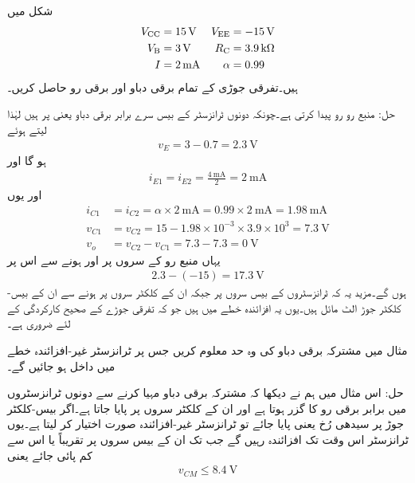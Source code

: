  
شکل  میں 
\begin{align*}
V_{\textup{CC}} &=\SI{+15}{\volt} & V_{\textup{EE}} &=\SI{-15}{\volt} \\
V_{\textup{B}} &=\SI{3}{\volt} &  R_{\textup{C}} &=\SI{3.9}{\kilo \ohm}\\
I &=\SI{2}{\milli \ampere} & \alpha &=\num{0.99}
\end{align*}
ہیں۔تفرقی جوڑی کے تمام برقی دباو اور برقی رو حاصل کریں۔

حل:	منبع رو  رو پیدا کرتی ہے۔چونکہ دونوں ٹرانزسٹر کے بیس  سرے برابر برقی دباو یعنی   پر ہیں لہٰذا   لیتے ہوئے
\begin{align*}
v_E=3-0.7=\SI{2.3}{\volt}
\end{align*}
ہو گا اور
\begin{align*}
i_{E1}=i_{E2}=\frac{\SI{4}{\milli \ampere}}{2}=\SI{2}{\milli \ampere}
\end{align*}
اور یوں
\begin{align*}
i_{C1}&=i_{C2}=\alpha \times \SI{2}{\milli \ampere}=0.99 \times \SI{2}{\milli \ampere}=\SI{1.98}{\milli \ampere}\\
v_{C1}&=v_{C2}=15-1.98\times 10^{-3} \times 3.9 \times 10^3=\SI{7.3}{\volt}\\
v_o&=v_{C2}-v_{C1}=7.3-7.3=\SI{0}{\volt}
\end{align*}
یہاں منبع رو کے سروں پر   اور  ہونے سے اس پر 
\begin{align*}
2.3-(-15)=\SI{17.3}{\volt}
\end{align*}
ہوں گے۔مزید یہ کہ ٹرانزسٹروں کے بیس  سروں پر  جبکہ ان کے کلکٹر سروں پر  ہونے سے ان کے بیس-کلکٹر  جوڑ الٹ مائل ہیں۔یوں یہ افزائندہ خطے میں ہیں جو کہ تفرقی جوڑے کے صحیح کارکردگی کے لئے ضروری ہے۔


مثال   میں مشترکہ برقی دباو کی وہ حد معلوم کریں جس پر ٹرانزسٹر غیر-افزائندہ خطے میں داخل ہو جائیں گے۔

حل:	اس مثال میں ہم نے دیکھا کہ مشترکہ برقی دباو مہیا کرنے سے دونوں ٹرانزسٹروں میں برابر برقی رو کا گزر ہوتا ہے اور ان کے کلکٹر سروں پر  پایا جاتا ہے۔اگر بیس-کلکٹر  جوڑ پر سیدھی رُخ  یعنی  پایا جائے تو ٹرانزسٹر غیر-افزائندہ صورت اختیار کر لیتا ہے۔یوں ٹرانزسٹر اس وقت تک افزائندہ رہیں گے جب تک ان کے بیس  سروں پر تقریباً  یا اس سے کم  پائی جائے  یعنی
\begin{align*}
v_{CM}\le \SI{8.4}{\volt}
\end{align*}

